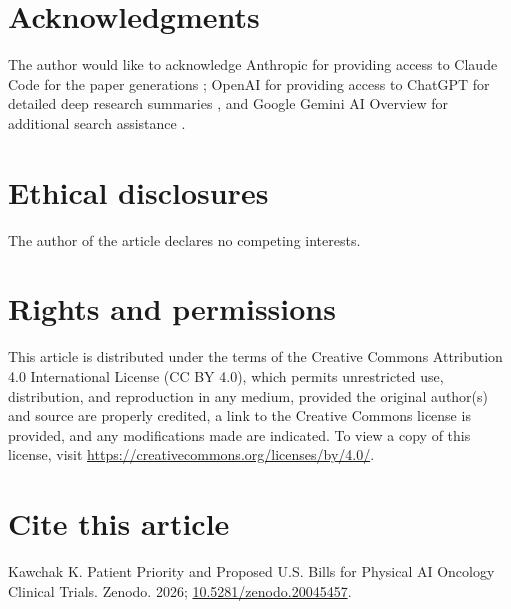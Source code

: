 
{}
\section*{Acknowledgments}
\label{sec:acknowledgments}

The author would like to acknowledge Anthropic for providing access to
Claude Code for the paper generations \cite{claude_code, claude_opus_47,
claude_sonnet_46}; OpenAI for providing access to ChatGPT for detailed
deep research summaries \cite{chatgpt_thinking}, and Google Gemini AI
Overview for additional search assistance \cite{google_gemini_overview}.

{}
\section*{Ethical disclosures}
\label{sec:ethics}

The author of the article declares no competing interests.

{}
\section*{Rights and permissions}
\label{sec:rights}

This article is distributed under the terms of the Creative Commons
Attribution 4.0 International License (CC BY 4.0), which permits
unrestricted use, distribution, and reproduction in any medium,
provided the original author(s) and source are properly credited, a
link to the Creative Commons license is provided, and any modifications
made are indicated. To view a copy of this license, visit
\url{https://creativecommons.org/licenses/by/4.0/}.

{}
\section*{Cite this article}
\label{sec:cite}

Kawchak K. Patient Priority and Proposed U.S. Bills for Physical AI
Oncology Clinical Trials. Zenodo. 2026;
\href{https://doi.org/10.5281/zenodo.20045457}{10.5281/zenodo.20045457}.
